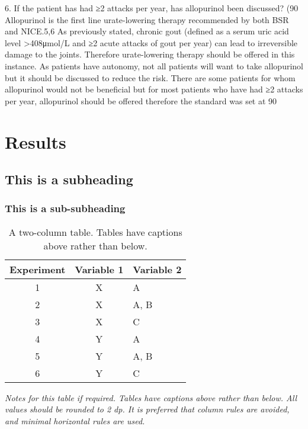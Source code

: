 \documentclass[paper=a4,fontsize=11pt,twocolumn]{article}
\begin{document}
6.	If the patient has had ≥2 attacks per year, has allopurinol been discussed? (90%
Allopurinol is the first line urate-lowering therapy recommended by both BSR and NICE.5,6 As previously stated, chronic gout (defined as a serum uric acid level >408μmol/L and ≥2 acute attacks of gout per year) can lead to irreversible damage to the joints. Therefore urate-lowering therapy should be offered in this instance. As patients have autonomy, not all patients will want to take allopurinol but it should be discussed to reduce the risk. 
There are some patients for whom allopurinol would not be beneficial but for most patients who have had ≥2 attacks per year, allopurinol should be offered therefore the standard was set at 90%
 

\section{Results}

\subsection{This is a subheading}

\subsubsection{This is a sub-subheading}

\begin{table}
\begin{centering}
\caption{A two-column table. Tables have captions above rather than below.}\label{tab:one-column}
	\begin{tabular}[\columnwidth]{ccl}\toprule
		Experiment &  Variable 1 &  Variable 2 \\
		\midrule
		1  & X & A \\
		2  & X & A, B \\
		3  & X & C \\
		4  & Y & A \\
		5  & Y & A, B \\
		6  & Y & C \\
		\bottomrule
	\end{tabular}\par
	\medskip
\textit{Notes for this table if required. Tables have captions above rather than below. All values should be rounded to 2 dp. It is preferred that column rules are avoided, and minimal horizontal rules are used.}\end{centering}
\end{table}
\end{document}
